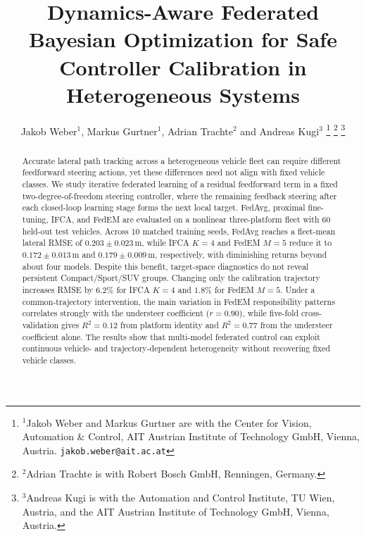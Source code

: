 
\usepackage{placeins}
\newif\ifshowdraftnotes
\showdraftnotesfalse
\newcommand{\regennote}[1]{\ifshowdraftnotes{{\color{MissingViolet}\textbf{[PLACEHOLDER: #1]}}}\fi}
\newcommand{\figupdate}[1]{\ifshowdraftnotes{{\color{red}\textbf{[FIGURE UPDATE BEFORE SUBMISSION: #1]}}}\fi}



\title{Dynamics-Aware Federated Bayesian Optimization for Safe Controller Calibration in Heterogeneous Systems}

\author{Jakob Weber$^{1}$, Markus Gurtner$^{1}$, Adrian Trachte$^{2}$ and Andreas Kugi$^{3}$%
\thanks{$^{1}$Jakob Weber and Markus Gurtner are with the Center for Vision, Automation \& Control, AIT Austrian Institute of Technology GmbH, Vienna, Austria. {\tt\small jakob.weber@ait.ac.at}}
\thanks{$^{2}$Adrian Trachte is with Robert Bosch GmbH, Renningen, Germany.}
\thanks{$^{3}$Andreas Kugi is with the Automation and Control Institute, TU Wien, Austria, and the AIT Austrian Institute of Technology GmbH, Vienna, Austria.}}

\maketitle

\begin{abstract}
Accurate lateral path tracking across a heterogeneous vehicle fleet can require different feedforward steering actions, yet these differences need not align with fixed vehicle classes.
We study iterative federated learning of a residual feedforward term in a fixed two-degree-of-freedom steering controller, where the remaining feedback steering after each closed-loop learning stage forms the next local target.
FedAvg, proximal fine-tuning, IFCA, and FedEM are evaluated on a nonlinear three-platform fleet with 60 held-out test vehicles.
Across 10 matched training seeds, FedAvg reaches a fleet-mean lateral RMSE of $0.203\pm0.023\,\mathrm{m}$, while IFCA $K=4$ and FedEM $M=5$ reduce it to $0.172\pm0.013\,\mathrm{m}$ and $0.179\pm0.009\,\mathrm{m}$, respectively, with diminishing returns beyond about four models.
Despite this benefit, target-space diagnostics do not reveal persistent Compact/Sport/SUV groups.
Changing only the calibration trajectory increases RMSE by $6.2\%$ for IFCA $K=4$ and $1.8\%$ for FedEM $M=5$.
Under a common-trajectory intervention, the main variation in FedEM responsibility patterns correlates strongly with the understeer coefficient ($r=0.90$), while five-fold cross-validation gives $R^2=0.12$ from platform identity and $R^2=0.77$ from the understeer coefficient alone.
The results show that multi-model federated control can exploit continuous vehicle- and trajectory-dependent heterogeneity without recovering fixed vehicle classes.
\end{abstract}

